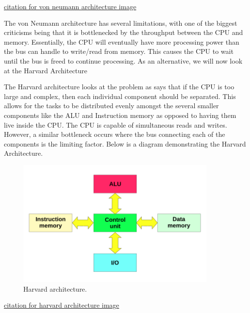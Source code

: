 \href{https://commons.wikimedia.org/wiki/File:Von_Neumann_Architecture.svg}{citation for von neumann architecture image}

The von Neumann architecture has several limitations, with one of the biggest criticisms being that it is bottlenecked by the throughput between the CPU and memory.
Essentially, the CPU will eventually have more processing power than the bus can handle to write/read from memory.
This causes the CPU to wait until the bus is freed to continue processing.
As an alternative, we will now look at the Harvard Architecture

The Harvard architecture looks at the problem as says that if the CPU is too large and complex, then each individual component should be separated.
This allows for the tasks to be distributed evenly amongst the several smaller components like the ALU and Instruction memory as opposed to having them live inside the CPU.
The CPU is capable of simultaneous reads and writes.
However, a similar bottleneck occurs where the bus connecting each of the components is the limiting factor.
Below is a diagram demonstrating the Harvard Architecture.

\begin{figure}[htb]
    \centering
    \includegraphics[width=10cm]{Images/Harvard_architecture.svg.png}
       \caption{Harvard architecture.}
           \label{Fig:HarvardArch}
\end{figure}

\href{https://commons.wikimedia.org/wiki/File:Harvard_architecture.svg}{citation for harvard architecture image}

